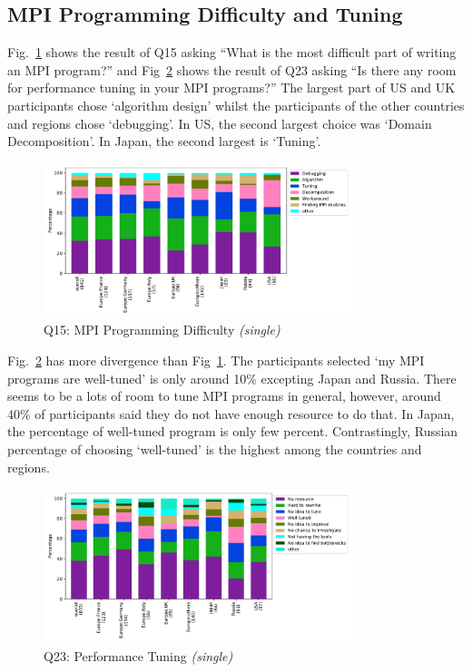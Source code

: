 \documentclass[conference,10pt,letterpaper]{IEEEtran}
\def\myquote#1{`#1'}
\begin{document}
\subsection{MPI Programming Difficulty and Tuning}

Fig.~\ref{fig:difficulty} shows the result of Q15 asking ``What is the
most difficult part of writing an MPI program?'' and
Fig~\ref{fig:tuning} shows the result of Q23 asking ``Is there any
room for performance tuning in your MPI programs?'' The largest part
of US and UK participants chose \myquote{algorithm design} whilst the
participants of the other countries and regions chose
\myquote{debugging}. In US, the second largest choice was
\myquote{Domain Decomposition}. In Japan, the second largest is
\myquote{Tuning}. 

\begin{figure}[htb]
\begin{center}
\includegraphics[width=9cm]{Figs/Q15.pdf}
\caption{Q15: MPI Programming Difficulty {\it(single)}}
\label{fig:difficulty}
\end{center}
\end{figure}

Fig.~\ref{fig:tuning} has more divergence than
Fig~\ref{fig:difficulty}. The participants selected \myquote{my MPI
  programs are well-tuned} is only around 10\% excepting Japan and
Russia. There seems to be a lots of room to tune MPI programs in
general, however, around 40\% of participants said they do not have
enough resource to do that. In Japan, the percentage of well-tuned
program is only few percent. Contrastingly, Russian percentage of
choosing \myquote{well-tuned} is the highest among the countries and
regions. 

\begin{figure}[htb]
\begin{center}
\includegraphics[width=9cm]{Figs/Q23.pdf}
\caption{Q23: Performance Tuning {\it(single)}}
\label{fig:tuning}
\end{center}
\end{figure}
\end{document}
